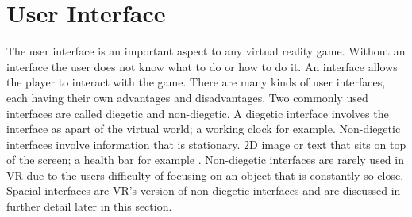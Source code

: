 \section{User Interface}
The user interface is an important aspect to any virtual reality game. Without an interface the user does not know what to do or how to do it. An interface allows the player to interact with the game. There are many kinds of user interfaces, each having their own advantages and disadvantages. Two commonly used interfaces are called diegetic and non-diegetic. A diegetic interface involves the interface as apart of the virtual world; a working clock for example. Non-diegetic interfaces involve information that is stationary. 2D image or text that sits on top of the screen; a health bar for example \cite{Iacovides2015}. Non-diegetic interfaces are rarely used in VR due to the users difficulty of focusing on an object that is constantly so close. Spacial interfaces are VR's version of non-diegetic interfaces and are discussed in further detail later in this section.   
